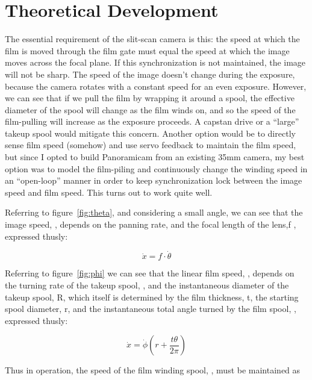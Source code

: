 \documentclass[dvips,12pt]{article}
\begin{document}
\section{Theoretical Development}

The essential requirement of the slit-scan camera is this: the speed at which the film is moved through the film gate must equal the speed at which the image moves across the focal plane. If this synchronization is not maintained, the image will not be sharp. 
The speed of the image doesn't change during the exposure, because the camera rotates with a constant speed for an even exposure. However, we can see that if we pull the film by wrapping it around a spool, the effective diameter of the spool will change as the film winds on, and so the speed of the film-pulling will increase as the exposure proceeds. A capstan drive or a ``large'' takeup spool would mitigate this concern. Another option would be to directly sense film speed (somehow) and use servo feedback to maintain the film speed, but since I opted to build Panoramicam from an existing 35mm camera, my best option was to model the film-piling and continuously change the winding speed in an ``open-loop'' manner in order to keep synchronization lock between the image speed and film speed. This turns out to work quite well. 

Referring to figure~\ref{fig:theta}, and considering a small angle, we can see that the image speed, \math {} \), depends on the panning rate, \math \dot{\theta} \) and the focal length of the lens,\math f \), expressed thusly:

\begin{displaymath}
\dot{x} = f \cdot \dot{\theta }
\end{displaymath}

Referring to figure~\ref{fig:phi} we can see that the linear film speed, \math {}\) , depends on the turning rate of the takeup spool, \math \dot{\phi}\), and the instantaneous diameter of the takeup spool, \math R\), which itself is determined by the film thickness, \math t\), the starting spool diameter, \math r\), and the instantaneous total angle turned by the film spool, \math \phi \), expressed thusly:

\begin{displaymath}
\dot{x} = \dot{\phi} \left( r+\frac{t\theta}{2\pi}\right)
\end{displaymath}

Thus in operation, the speed of the film winding spool, \math \dot{\theta} \), must be maintained as
\end{document}
